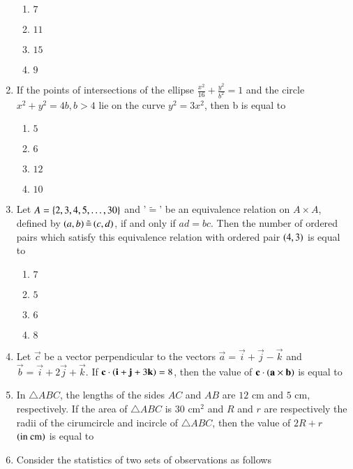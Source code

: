 \documentclass[journal,onecolumn]{IEEEtran}
\theoremstyle{remark}
\begin{document}
\begin{enumerate}
	\begin{enumerate}
		\item $7$ 
		\item $11$
		\item $15$
		\item $9$
	\end{enumerate}


    \item If the points of intersections of the ellipse $\frac{x^2}{16} + \frac{y^2}{b^2} = 1$ and the circle $x^2 + y^2 = 4b, b > 4$ lie on the curve $y^2 = 3x^2$, then b is equal to

	\begin{enumerate}
		\item $5$ 
		\item $6$
		\item $12$
		\item $10$
	\end{enumerate}

    \item Let $A = \left\{2, 3, 4, 5, \dots, 30\right\}$ and '$\tilde{=}$' be an equivalence relation on $A \times A$, defined by $\left(a, b\right) \tilde{=} \left(c, d\right)$, if and only if $ad = bc$. Then the number of ordered pairs which satisfy this equivalence relation with ordered pair $\left(4, 3\right)$ is equal to

	\begin{enumerate}
		\item $7$ 
		\item $5$
		\item $6$
		\item $8$
	\end{enumerate}

    \item Let $\vec{c}$ be a vector perpendicular to the vectors $\vec{a} = \vec{i} + \vec{j} - \vec{k}$ and $\vec{b} = \vec{i} + 2\vec{j} + \vec{k}$. If $\mathbf{c} \cdot \left(\mathbf{i} + \mathbf{j} + 3\mathbf{k}\right) = 8$, then the value of $\mathbf{c} \cdot \left(\mathbf{a}\times\mathbf{b}\right)$ is equal to

    \item In $\triangle ABC$, the lengths of the sides $AC$ and $AB$ are $12$ cm and $5$ cm, respectively. If the area of $\triangle ABC$ is $30$ $\text{cm}^2$ and $R$ and $r$ are respectively the radii of the cirumcircle and incircle of $\triangle ABC$, then the value of $2R + r$ $\left(\text{in cm}\right)$ is equal to

    \item Consider the statistics of two sets of observations as follows


\end{enumerate}
\end{document}
